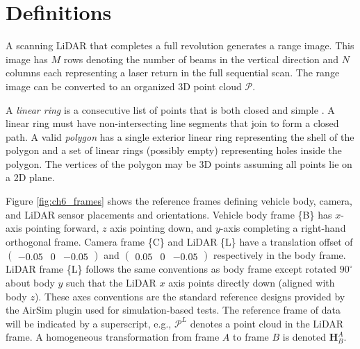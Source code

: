 \section{Definitions}\label{sec:ch6_definitions}

A scanning LiDAR that completes a full revolution generates a range image. This image has $M$ rows denoting the number of beams in the vertical direction and $N$ columns each representing a laser return in the full sequential scan. The range image can be converted to an organized 3D point cloud $\mathcal{P}$. 


A \textit{linear ring} is a consecutive list of points that is both closed and simple \cite{herring_opengis_2006-1}. A linear ring must have non-intersecting line segments that join to form a closed path. A valid \textit{polygon} has a single exterior linear ring representing the shell of the polygon and a set of linear rings (possibly empty) representing holes inside the polygon. The vertices of the polygon may be 3D points assuming all points lie on a 2D plane.

Figure \ref{fig:ch6_frames} shows the reference frames defining vehicle body, camera, and LiDAR sensor placements and orientations.  Vehicle body frame \{B\} has $x$-axis pointing forward, $z$ axis pointing down, and $y$-axis completing a right-hand orthogonal frame. Camera frame \{C\} and LiDAR \{L\} have a translation offset of $\begin{pmatrix}-0.05 & 0 & -0.05\end{pmatrix}$ and $\begin{pmatrix}0.05 & 0 & -0.05\end{pmatrix}$ respectively in the body frame. LiDAR frame \{L\} follows the same conventions as body frame except rotated $90^\circ$ about body $y$ such that the LiDAR $x$ axis points directly down (aligned with body $z$). These axes conventions are the standard reference designs provided by the AirSim plugin used for simulation-based tests. The reference frame of data will be indicated by a superscript, e.g., $\mathcal{P}^{L}$ denotes a point cloud in the LiDAR frame. A homogeneous transformation from frame $A$ to frame $B$ is denoted $\mathbf{H}^A_B$.

